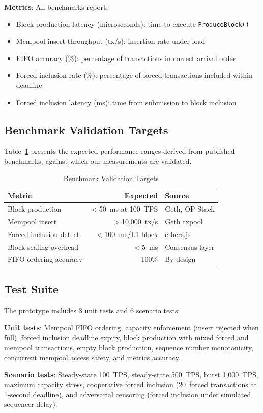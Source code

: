 \textbf{Metrics}: All benchmarks report:
\begin{itemize}
  \item Block production latency (microseconds): time to execute \texttt{ProduceBlock()}
  \item Mempool insert throughput (tx/s): insertion rate under load
  \item FIFO accuracy (\%): percentage of transactions in correct arrival order
  \item Forced inclusion rate (\%): percentage of forced transactions included within deadline
  \item Forced inclusion latency (ms): time from submission to block inclusion
\end{itemize}

\subsection{Benchmark Validation Targets}

Table~\ref{tab:validation-targets} presents the expected performance ranges derived
from published benchmarks, against which our measurements are validated.

\begin{table}[htbp]
\caption{Benchmark Validation Targets}
\label{tab:validation-targets}
\centering
\begin{tabular}{lrl}
\toprule
\textbf{Metric} & \textbf{Expected} & \textbf{Source} \\
\midrule
Block production & $<$50~ms at 100~TPS & Geth, OP Stack \\
Mempool insert & $>$10{,}000~tx/s & Geth txpool \\
Forced inclusion detect. & $<$100~ms/L1 block & ethers.js \\
Block sealing overhead & $<$5~ms & Consensus layer \\
FIFO ordering accuracy & 100\% & By design \\
\bottomrule
\end{tabular}
\end{table}

\subsection{Test Suite}

The prototype includes 8 unit tests and 6 scenario tests:

\textbf{Unit tests}: Mempool FIFO ordering, capacity enforcement (insert rejected when
full), forced inclusion deadline expiry, block production with mixed forced and mempool
transactions, empty block production, sequence number monotonicity, concurrent mempool
access safety, and metrics accuracy.

\textbf{Scenario tests}: Steady-state 100~TPS, steady-state 500~TPS, burst 1{,}000~TPS,
maximum capacity stress, cooperative forced inclusion (20~forced transactions at 1-second
deadline), and adversarial censoring (forced inclusion under simulated sequencer delay).
